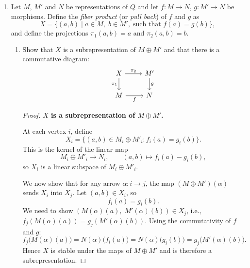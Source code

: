\documentclass[11pt, a4paper]{article}
\begin{document}
\begin{enumerate}[leftmargin=*, label=\textbf{\arabic*.}]
\begin{proof}
        Therefore $a$ and $b$ are inverse isomorphisms, and hence
        \[
        H\cong C=\bigl(N_i/f_i(M_i),\ \overline{\psi}_\alpha\bigr).
        \]
        
        In particular, for each vertex $i$ we have
        \[
        H_i\cong N_i/f_i(M_i),
        \]
        and under these identifications, for every arrow $\alpha:i\to j$,
        \[
        \chi_\alpha
        =
        a_j^{-1}\circ \overline{\psi}_\alpha\circ a_i.
        \]
        Thus any cokernel given by the universal property is isomorphic to the pointwise quotient representation
        \[
        \bigl(N_i/f_i(M_i),\ \psi_\alpha \text{ induced on the quotients}\bigr).
        \]
\end{proof}

\item Let $M$, $M'$ and $N$ be representations of $Q$ and let $f \colon M \to N$, $g \colon M' \to N$ be morphisms. Define the \emph{fiber product} (or \emph{pull back}) of $f$ and $g$ as
\[
    X = \{(a, b) \mid a \in M,\; b \in M',\; \text{such that } f(a) = g(b)\},
\]
and define the projections $\pi_1(a, b) = a$ and $\pi_2(a, b) = b$.

\begin{enumerate}[label=(\alph*)]
    \item Show that $X$ is a subrepresentation of $M \oplus M'$ and that there is a commutative diagram:
    \[
    \begin{tikzcd}
        X \arrow[r, "\pi_2"] \arrow[d, "\pi_1"'] & M' \arrow[d, "g"] \\
        M \arrow[r, "f"'] & N
    \end{tikzcd}
    \]
    \begin{proof}
    \textbf{$X$ is a subrepresentation of $M\oplus M'$.}
    
    At each vertex $i$, define
    \[
    X_i = \{(a,b)\in M_i\oplus M'_i : f_i(a) = g_i(b)\}.
    \]
    This is the kernel of the linear map
    \[
    M_i\oplus M'_i \longrightarrow N_i,\qquad (a,b)\longmapsto f_i(a)-g_i(b),
    \]
    so $X_i$ is a linear subspace of $M_i\oplus M'_i$.

    We now show that for any arrow $\alpha\colon i\to j$, the map $(M\oplus M')(\alpha)$ sends $X_i$ into $X_j$. Let $(a,b)\in X_i$, so
    \[
    f_i(a)=g_i(b).
    \]
    We need to show $(M(\alpha)(a),\; M'(\alpha)(b)) \in X_j$, i.e., $f_j(M(\alpha)(a)) = g_j(M'(\alpha)(b))$. Using the commutativity of $f$ and $g$:
    \[
    f_j\bigl(M(\alpha)(a)\bigr) = N(\alpha)\bigl(f_i(a)\bigr) = N(\alpha)\bigl(g_i(b)\bigr) = g_j\bigl(M'(\alpha)(b)\bigr).
    \]
    Hence $X$ is stable under the maps of $M\oplus M'$ and is therefore a subrepresentation.


\end{proof}
\end{enumerate}
\end{enumerate}
\end{document}

